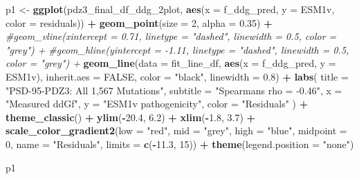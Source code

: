 \documentclass[
]{article}
\newenvironment{Shaded}{\begin{snugshade}}{\end{snugshade}}
\newcommand{\AttributeTok}[1]{\textcolor[rgb]{0.13,0.29,0.53}{#1}}
\newcommand{\CommentTok}[1]{\textcolor[rgb]{0.56,0.35,0.01}{\textit{#1}}}
\newcommand{\ConstantTok}[1]{\textcolor[rgb]{0.56,0.35,0.01}{#1}}
\newcommand{\DecValTok}[1]{\textcolor[rgb]{0.00,0.00,0.81}{#1}}
\newcommand{\FloatTok}[1]{\textcolor[rgb]{0.00,0.00,0.81}{#1}}
\newcommand{\FunctionTok}[1]{\textcolor[rgb]{0.13,0.29,0.53}{\textbf{#1}}}
\newcommand{\NormalTok}[1]{#1}
\newcommand{\OtherTok}[1]{\textcolor[rgb]{0.56,0.35,0.01}{#1}}
\newcommand{\SpecialCharTok}[1]{\textcolor[rgb]{0.81,0.36,0.00}{\textbf{#1}}}
\newcommand{\StringTok}[1]{\textcolor[rgb]{0.31,0.60,0.02}{#1}}
\begin{document}
\begin{Shaded}
\begin{Highlighting}[]
\NormalTok{p1 }\OtherTok{\textless{}{-}} \FunctionTok{ggplot}\NormalTok{(pdz3\_final\_df\_ddg\_2plot, }\FunctionTok{aes}\NormalTok{(}\AttributeTok{x =}\NormalTok{ f\_ddg\_pred, }\AttributeTok{y =}\NormalTok{ ESM1v, }\AttributeTok{color =}\NormalTok{ residuals)) }\SpecialCharTok{+}
  \FunctionTok{geom\_point}\NormalTok{(}\AttributeTok{size =} \DecValTok{2}\NormalTok{, }\AttributeTok{alpha =} \FloatTok{0.35}\NormalTok{) }\SpecialCharTok{+}
  \CommentTok{\#geom\_vline(xintercept = 0.71, linetype = "dashed", linewidth = 0.5, color = "grey") +}
  \CommentTok{\#geom\_hline(yintercept = {-}1.11, linetype = "dashed", linewidth = 0.5, color = "grey") +}
  \FunctionTok{geom\_line}\NormalTok{(}\AttributeTok{data =}\NormalTok{ fit\_line\_df, }\FunctionTok{aes}\NormalTok{(}\AttributeTok{x =}\NormalTok{ f\_ddg\_pred, }\AttributeTok{y =}\NormalTok{ ESM1v),}
            \AttributeTok{inherit.aes =} \ConstantTok{FALSE}\NormalTok{, }\AttributeTok{color =} \StringTok{"black"}\NormalTok{, }\AttributeTok{linewidth =} \FloatTok{0.8}\NormalTok{) }\SpecialCharTok{+}
  \FunctionTok{labs}\NormalTok{(}
    \AttributeTok{title =} \StringTok{"PSD{-}95{-}PDZ3: All 1,567 Mutations"}\NormalTok{,}
    \AttributeTok{subtitle =} \StringTok{"Spearman\textquotesingle{}s rho = {-}0.46"}\NormalTok{,}
    \AttributeTok{x =} \StringTok{"Measured ddGf"}\NormalTok{,}
    \AttributeTok{y =} \StringTok{"ESM1v pathogenicity"}\NormalTok{,}
    \AttributeTok{color =} \StringTok{"Residuals"}
\NormalTok{  ) }\SpecialCharTok{+}
  \FunctionTok{theme\_classic}\NormalTok{() }\SpecialCharTok{+}
  \FunctionTok{ylim}\NormalTok{(}\SpecialCharTok{{-}}\FloatTok{20.4}\NormalTok{, }\FloatTok{6.2}\NormalTok{) }\SpecialCharTok{+} \FunctionTok{xlim}\NormalTok{(}\SpecialCharTok{{-}}\FloatTok{1.8}\NormalTok{, }\FloatTok{3.7}\NormalTok{) }\SpecialCharTok{+}
  \FunctionTok{scale\_color\_gradient2}\NormalTok{(}\AttributeTok{low =} \StringTok{"red"}\NormalTok{, }\AttributeTok{mid =} \StringTok{"grey"}\NormalTok{, }\AttributeTok{high =} \StringTok{"blue"}\NormalTok{, }\AttributeTok{midpoint =} \DecValTok{0}\NormalTok{, }\AttributeTok{name =} \StringTok{"Residuals"}\NormalTok{,}
                        \AttributeTok{limits =} \FunctionTok{c}\NormalTok{(}\SpecialCharTok{{-}}\FloatTok{11.3}\NormalTok{, }\DecValTok{15}\NormalTok{)) }\SpecialCharTok{+}
  \FunctionTok{theme}\NormalTok{(}\AttributeTok{legend.position =} \StringTok{"none"}\NormalTok{)}

\NormalTok{p1}
\end{Highlighting}
\end{Shaded}
\end{document}
